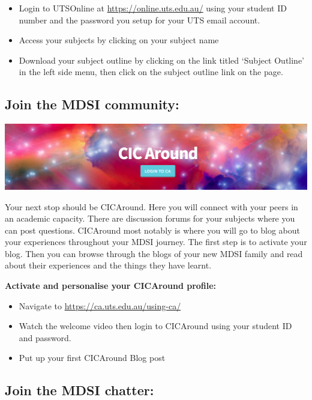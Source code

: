 \documentclass[]{book}
\providecommand{\tightlist}{%
  \setlength{\itemsep}{0pt}\setlength{\parskip}{0pt}}
\theoremstyle{definition}
\theoremstyle{definition}
\theoremstyle{remark}
\begin{document}
\begin{itemize}
\tightlist
\item
  Login to UTSOnline at \url{https://online.uts.edu.au/} using your
  student ID number and the password you setup for your UTS email
  account.
\item
  Access your subjects by clicking on your subject name
\item
  Download your subject outline by clicking on the link titled `Subject
  Outline' in the left side menu, then click on the subject outline link
  on the page.
\end{itemize}

\subsection{Join the MDSI community:}\label{join-the-mdsi-community}

\includegraphics{images/CAlogo.png}

Your next stop should be CICAround. Here you will connect with your
peers in an academic capacity. There are discussion forums for your
subjects where you can post questions. CICAround most notably is where
you will go to blog about your experiences throughout your MDSI journey.
The first step is to activate your blog. Then you can browse through the
blogs of your new MDSI family and read about their experiences and the
things they have learnt.

\textbf{Activate and personalise your CICAround profile:}

\begin{itemize}
\tightlist
\item
  Navigate to \url{https://ca.uts.edu.au/using-ca/}
\item
  Watch the welcome video then login to CICAround using your student ID
  and password.
\item
  Put up your first CICAround Blog post
\end{itemize}

\subsection{Join the MDSI chatter:}\label{join-the-mdsi-chatter}
\end{document}
